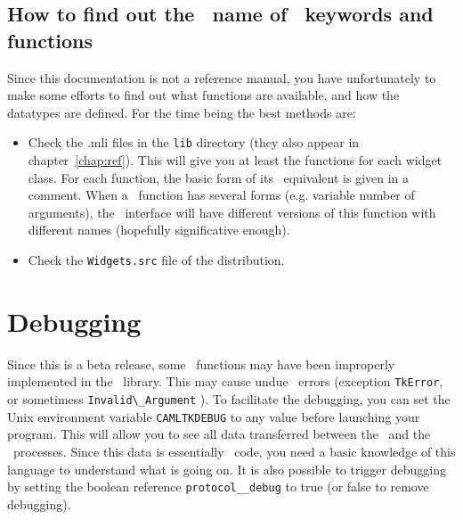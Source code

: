 \subsection{How to find out the \caml\ name of \tk\ keywords and functions}
Since this documentation is not a reference manual, you have unfortunately
to make some efforts to find out what functions are available, and how the
datatypes are defined. For the time being the best methods are:
\begin{itemize}
\item Check the .mli files in the \verb|lib| directory (they also appear in
chapter~\ref{chap:ref}). This will give you at least the functions for each
widget class. For each function, the basic form of its \tk\ equivalent is
given in a comment. When a \tk\  function has several forms (e.g. variable
number of arguments), the \camltk\ interface will have different versions of
this function with different names (hopefully significative enough).

\item Check the \verb|Widgets.src| file of the distribution. 

\end{itemize} 

\section{Debugging}
Since this is a beta release, some \tk\ functions may have been improperly
implemented in the \camltk\ library. This may cause undue \tk\ errors
(exception \verb|TkError|, or sometimess \verb|Invalid\_Argument| ). To
facilitate the debugging, you can set the 
Unix environment variable \verb|CAMLTKDEBUG| to any value before launching
your program. This will allow you to see all
data transferred between the \caml\ and the \tk\ processes. Since this data is
essentially \tcl\tk\ code, you need a basic knowledge of this language to
understand what is going on.
It is also possible to trigger debugging by setting the boolean reference
\verb|protocol__debug| to true (or false to remove debugging).
